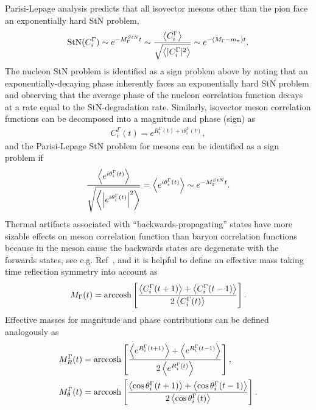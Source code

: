 Parisi-Lepage analysis predicts that all isovector mesons other than the pion face an exponentially hard StN problem,
\begin{equation}
  \begin{split}
    \text{StN}(C_i^\Gamma) \sim e^{-M_\Gamma^{StN}t} \sim \frac{\left< C_i^\Gamma \right>}{\sqrt{\left< |C_i^\Gamma|^2 \right>}} \sim e^{-(M_\Gamma - m_\pi)t}.
  \end{split}\label{eq:mesonstn}
\end{equation}
The nucleon StN problem is identified as a sign problem above by noting that an exponentially-decaying phase inherently faces an exponentially hard StN problem and observing that the average phase of the nucleon correlation function decays at a rate equal to the StN-degradation rate.
Similarly, isovector meson correlation functions can be decomposed into a magnitude and phase (sign) as
\begin{equation}
  \begin{split}
    C^\Gamma_i(t) = e^{R^\Gamma_i(t) + i\theta^\Gamma_i(t)},
  \end{split}\label{eq:mesondef}
\end{equation}
and the Parisi-Lepage StN problem for mesons can be identified as a sign problem if
\begin{equation}
  \begin{split}
    \frac{\left< e^{i\theta^\Gamma_i(t)} \right>}{\sqrt{\left< \left|e^{i\theta^\Gamma_i(t)}\right|^2 \right>}} = \left< e^{i\theta^\Gamma_i(t)} \right> \sim e^{-M_\Gamma^{StN} t}.
  \end{split}\label{eq:phaseStN}
\end{equation}
Thermal artifacts associated with ``backwards-propagating'' states have more sizable effects on meson correlation function than baryon correlation functions
because in the meson cause the backwards states are degenerate with the forwards states, see e.g. Ref~\cite{Beane:2009kya},
and it is helpful to define an effective mass taking time reflection symmetry into account as
\begin{equation}
  \begin{split}
    M_\Gamma(t) = \text{arccosh}\left[ \frac{\left< C_i^\Gamma(t+1) \right> + \left< C_i^\Gamma(t-1) \right>}{2\left< C_i^\Gamma(t) \right>} \right].
  \end{split}\label{mGamma}
\end{equation}
Effective masses for magnitude and phase contributions can be defined analogously as
\begin{equation}
  \begin{split}
    M_R^\Gamma(t) &= \text{arccosh}\left[ \frac{\left< e^{R_i^\Gamma(t+1)} \right> + \left< e^{R_i^\Gamma(t-1)} \right>}{2\left< e^{R_i^\Gamma(t)} \right>} \right], \\ 
    M_\theta^\Gamma(t) &=  \text{arccosh}\left[ \frac{\left< \cos \theta_i^\Gamma(t+1) \right> + \left< \cos \theta_i^\Gamma(t-1) \right>}{2\left< \cos \theta_i^\Gamma(t) \right>} \right].
  \end{split}\label{mGammaRTh}
\end{equation}
